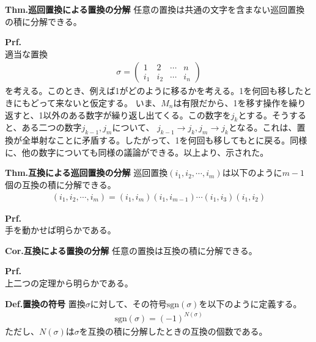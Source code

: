 \documentclass[a4paper,11pt]{jsarticle}
\numberwithin{equation}{section}
\begin{document}
\begin{itembox}[l]{\textbf{Thm.巡回置換による置換の分解}}
  任意の置換は共通の文字を含まない巡回置換の積に分解できる。
\end{itembox}
\textbf{Prf.}\\
適当な置換
\begin{align}
  \sigma = \begin{pmatrix}
    1 & 2 & \cdots & n\\
    i_1 & i_2 & \cdots & i_n
  \end{pmatrix}
\end{align}
を考える。このとき、例えば1がどのように移るかを考える。1を何回も移したときにもどって来ないと仮定する。
いま、$M_n$は有限だから、1を移す操作を繰り返すと、1以外のある数字が繰り返し出てくる。この数字を$j_k$とする。そうすると、ある二つの数字$j_{k-1},j_m$について、
$j_{k-1} \to j_k, j_m \to j_{k}$となる。これは、置換が全単射なことに矛盾する。したがって、1を何回も移してもとに戻る。同様に、他の数字についても同様の議論ができる。以上より、示された。\hfill\qedsymbol\\

\begin{itembox}[l]{\textbf{Thm.互換による巡回置換の分解}}
  巡回置換$(i_1,i_2,\cdots,i_m)$は以下のように$m-1$個の互換の積に分解できる。
  \begin{align}
    (i_1,i_2,\cdots,i_m) = (i_1,i_m)(i_1,i_{m-1})\cdots(i_1,i_3)(i_1,i_2)
  \end{align}
\end{itembox}
\textbf{Prf.}\\
手を動かせば明らかである。\hfill\qedsymbol\\

\begin{itembox}[l]{\textbf{Cor.互換による置換の分解}}
  任意の置換は互換の積に分解できる。
\end{itembox}
\textbf{Prf.}\\
上二つの定理から明らかである。\hfill\qedsymbol\\

\begin{itembox}[l]{\textbf{Def.置換の符号}}
  置換$\sigma$に対して、その符号$\text{sgn}(\sigma)$を以下のように定義する。
  \begin{align}
    \text{sgn}(\sigma) = (-1)^{N(\sigma)}
  \end{align}
  ただし、$N(\sigma)$は$\sigma$を互換の積に分解したときの互換の個数である。
\end{itembox}
\end{document}
